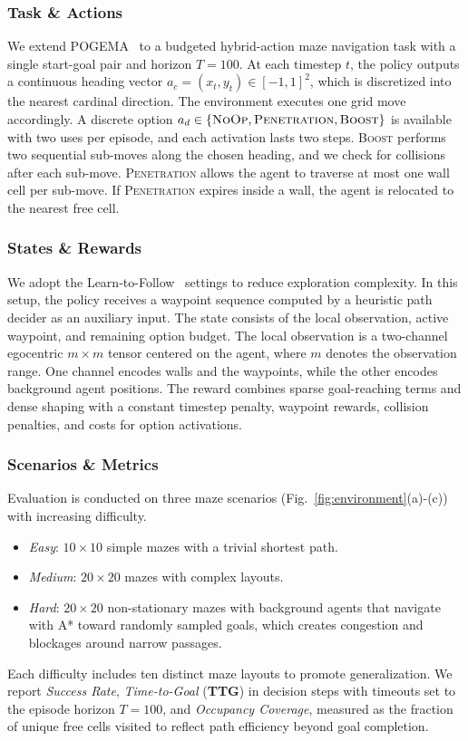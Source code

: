 \subsubsection{Task \& Actions}
We extend POGEMA~\cite{skrynnik2024pogema} to a budgeted hybrid-action maze navigation task with a single start-goal pair and horizon $T=100$.
At each timestep $t$, the policy outputs a continuous heading vector $a_c=(x_t, y_t)\in[-1, 1]^2$, which is discretized into the nearest cardinal direction.
The environment executes one grid move accordingly.
A discrete option $a_d \in \{\textsc{NoOp}, \textsc{Penetration}, \textsc{Boost}\}$ is available with two uses per episode, and each activation lasts two steps.
\textsc{Boost} performs two sequential sub-moves along the chosen heading, and we check for collisions after each sub-move.
\textsc{Penetration} allows the agent to traverse at most one wall cell per sub-move.
If \textsc{Penetration} expires inside a wall, the agent is relocated to the nearest free cell.

\subsubsection{States \& Rewards}
We adopt the Learn-to-Follow~\cite{skrynnik2024learn} settings to reduce exploration complexity. 
In this setup, the policy receives a waypoint sequence computed by a heuristic path decider as an auxiliary input.
The state consists of the local observation, active waypoint, and remaining option budget.
The local observation is a two-channel egocentric $m \times m$ tensor centered on the agent, where $m$ denotes the observation range.
One channel encodes walls and the waypoints, while the other encodes background agent positions.
The reward combines sparse goal-reaching terms and dense shaping with a constant timestep penalty, waypoint rewards, collision penalties, and costs for option activations.

\subsubsection{Scenarios \& Metrics}
Evaluation is conducted on three maze scenarios (Fig.~\ref{fig:environment}(a)-(c)) with increasing difficulty.

\begin{itemize}
    \item \emph{Easy}: $10 \times 10$ simple mazes with a trivial shortest path.
    \item \emph{Medium}: $20 \times 20$ mazes with complex layouts.
    \item \emph{Hard}: $20 \times 20$ non-stationary mazes with background agents that navigate with A* toward randomly sampled goals, which creates congestion and blockages around narrow passages.
\end{itemize}
Each difficulty includes ten distinct maze layouts to promote generalization.
We report \emph{Success Rate}, \emph{Time-to-Goal} (\textbf{TTG}) in decision steps with timeouts set to the episode horizon $T=100$, and \emph{Occupancy Coverage}, measured as the fraction of unique free cells visited to reflect path efficiency beyond goal completion.

